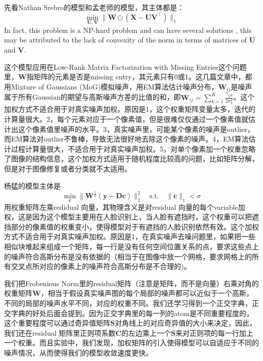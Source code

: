 \documentclass[10pt,twocolumn,letterpaper]{article}
\begin{document}
先看Nathan Srebro的模型\cite{srebro2003weighted}和孟老师的模型\cite{meng2013robust}，其主体都是：
\begin{equation}
\min_{\mathbf{U},\mathbf{V}}\|\mathbf{W}\odot(\mathbf{X}-\mathbf{U}\mathbf{V}^{\top})\|_{1}
\end{equation}
In fact, this problem is a NP-hard problem and can have several solutions \cite{GillisGlineur}, this may be attributed to the lack of convexity of the norm in terms of matrices of $\mathbf{U}$ and $\mathbf{V}$.

这个模型应用在Low-Rank Matrix Factorization with Missing Entries这个问题里，$\mathbf{W}$指矩阵的元素是否是missing entry，其元素只有0或1。这几篇文章中，都用Mixture of Gaussians (MoG)模拟噪声，用EM算法估计噪声分布，$\mathbf{W}_{ij}$是噪声属于所有Gaussian的期望与高斯噪声方差的比值的和，即$\mathbf{W}_{ij}=\sum_{k=1}^{K}\frac{\gamma_{ijk}}{2\sigma_{k}^{2}}$。这个加权方式不适合用于对真实噪声加权。原因是1，这个权重矩阵变量太多，迭代的计算量很大。2，每个元素对应于一个像素值，但是很难仅仅通过一个像素值就估计出这个像素值里噪声的水平。3，真实噪声里，可能某个像素的噪声是outlier，而EM算法对outlier不鲁棒，导致无法很好地去除这个像素的噪声。4，EM算法估计过程计算量很大，不适合用于对真实噪声加权。5，对单个像素加一个权重忽略了图像的结构信息，这个加权方式适用于随机程度比较高的问题，比如矩阵分解，但是对于图像修复或者分类就不太适用。

杨猛的模型\cite{yang2011robust}主体是
\begin{equation}
\min_{\mathbf{c}}\|\mathbf{W}^{\frac{1}{2}}(\mathbf{y}-\mathbf{D}\mathbf{c})\|_{2}^{2}
\quad
\text{s.t.}
\quad
\|\mathbf{c}\|_{1}<\sigma
\end{equation}
用权重矩阵左乘redidual 向量，其物理含义是对residual 向量的每个variable加权，这是因为这个模型主要用在人脸识别上，当人脸有遮挡时，这个权重可以把遮挡部分的像素值的权重变小，使得模型对于有遮挡的人脸识别依然有效。这个加权方式不适合用于对真实噪声加权。原因是1，在真实噪声去噪问题里，如果把一些相似块堆起来组成一个矩阵，每一行是没有任何空间位置关系的点，要求这些点上的噪声符合高斯分布是没有依据的（相当于在图像中放一个网格，要求网格上的所有交叉点所对应的像素上的噪声符合高斯分布是不合理的)。

我们把Frobenious Norm里的residual矩阵（注意是矩阵，而不是向量）右乘对角的权重矩阵$\mathbf{W}$，相当于假设真实噪声图的每个局部的噪声都可以近似于一个高斯，不同的局部的噪声水平不同，对应的权重不同。我们还学习得到一个正交字典，正交字典的好处后面会提到。因为正交字典里的每一列的atom是不同重要程度的，这个重要程度可以通过奇异值矩阵$\mathbf{S}$对角线上的对应奇异值的大小来决定，因此，我们还在residual 矩阵里正则项系数$\mathbf{C}$的左边乘上一个$\mathbf{S}$来对正则项的每一行加上一个权重。而且实验中，我们发现，加权矩阵的引入使得模型可以自适应于不同的噪声情况，从而使得我们的模型收敛速度更快。
\end{document}
